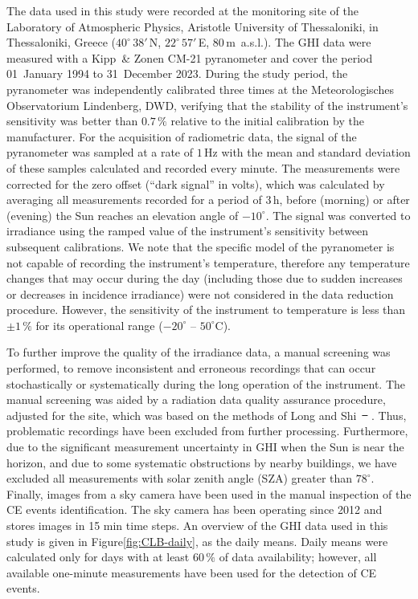 \documentclass[preprint, 5p,
authoryear]{elsarticle} %
\providecommand{\DIFaddtex}[1]{{\protect\color{blue}\uwave{#1}}} %
\providecommand{\DIFdeltex}[1]{{\protect\color{red}\sout{#1}}}                      %
\providecommand{\DIFaddbegin}{} %
\providecommand{\DIFaddend}{} %
\providecommand{\DIFdelbegin}{} %
\providecommand{\DIFdelend}{} %
\providecommand{\DIFadd}[1]{\texorpdfstring{\DIFaddtex{#1}}{#1}} %
\providecommand{\DIFdel}[1]{\texorpdfstring{\DIFdeltex{#1}}{}} %
\newcommand{\DIFscaledelfig}{0.5}
\newlength{\DIFdelgraphicswidth} %
\newlength{\DIFdelgraphicsheight} %
\newcommand{\DIFaddincludegraphics}[2][]{{\color{blue}\fbox{\DIFOincludegraphics[#1]{#2}}}} %
\newcommand{\DIFdelincludegraphics}[2][]{%
\sbox{\DIFdelgraphicsbox}{\DIFOincludegraphics[#1]{#2}}%
\settoboxwidth{\DIFdelgraphicswidth}{\DIFdelgraphicsbox} %
\settoboxtotalheight{\DIFdelgraphicsheight}{\DIFdelgraphicsbox} %
\scalebox{\DIFscaledelfig}{%
\parbox[b]{\DIFdelgraphicswidth}{\usebox{\DIFdelgraphicsbox}\\[-\baselineskip] \rule{\DIFdelgraphicswidth}{0em}}\llap{\resizebox{\DIFdelgraphicswidth}{\DIFdelgraphicsheight}{%
\setlength{\unitlength}{\DIFdelgraphicswidth}%
\begin{picture}(1,1)%
\thicklines\linethickness{2pt} %
{\color[rgb]{1,0,0}\put(0,0){\framebox(1,1){}}}%
{\color[rgb]{1,0,0}\put(0,0){\line( 1,1){1}}}%
{\color[rgb]{1,0,0}\put(0,1){\line(1,-1){1}}}%
\end{picture}%
}\hspace*{3pt}}} %
} %
\DeclareRobustCommand{\DIFaddbegin}{\DIFOaddbegin \let\includegraphics\DIFaddincludegraphics} %
\DeclareRobustCommand{\DIFaddend}{\DIFOaddend \let\includegraphics\DIFOincludegraphics} %
\DeclareRobustCommand{\DIFdelbegin}{\DIFOdelbegin \let\includegraphics\DIFdelincludegraphics} %
\DeclareRobustCommand{\DIFdelend}{\DIFOaddend \let\includegraphics\DIFOincludegraphics} %
\begin{document}
The data used in this study were recorded at the monitoring site of the
Laboratory of Atmospheric Physics, Aristotle University of Thessaloniki,
in Thessaloniki, Greece (\(40^\circ\,38'\,\)N, \(22^\circ\,57'\,\)E,
\(80\,\)m~a.s.l.). The GHI data were measured with a Kipp~\& Zonen CM-21
pyranometer and cover the period 01~January 1994 to 31~December 2023.
During the study period, the pyranometer was independently calibrated
three times at the Meteorologisches Observatorium Lindenberg, DWD,
verifying that the stability of the instrument's sensitivity was better
than \(0.7\,\%\) relative to the initial calibration by the
manufacturer. For the acquisition of radiometric data, the signal of the
pyranometer was sampled at a rate of \(1\,\text{Hz}\) with the mean and
standard deviation of these samples calculated and recorded every
minute. The measurements were corrected for the zero offset (``dark
signal'' in volts), which was calculated by averaging all measurements
recorded for a period of \(3\,\text{h}\), before (morning) or after
(evening) the Sun reaches an elevation angle of \(-10^\circ\). The
signal was converted to irradiance using the ramped value of the
instrument's sensitivity between subsequent calibrations. We note that
the specific model of the pyranometer is not capable of recording the
instrument's temperature, therefore any temperature changes that may
occur during the day (including those due to sudden increases or
decreases in incidence irradiance) were not considered in the data
reduction procedure. However, the sensitivity of the instrument to
temperature is less than \(\pm1\,\%\) for its operational range
(\(-20^\circ\) -- \(50^\circ\)C).

To further improve the quality of the irradiance data, a manual
screening was performed, to remove inconsistent and erroneous recordings
that can occur stochastically or systematically during the long
operation of the instrument. The manual screening was aided by a
radiation data quality assurance procedure, adjusted for the site, which
was based on the methods of Long and
Shi~\DIFdelbegin \DIFdel{\mbox{%
\citep{Long2006, Long2008a}}\hskip0pt%
}\DIFdelend \DIFaddbegin \DIFadd{\mbox{%
\citetext{\citeyear{Long2006}; \citeyear{Long2008a}}}\hskip0pt%
}\DIFaddend . Thus,
problematic recordings have been excluded from further processing.
Furthermore, due to the significant measurement uncertainty in GHI when
the Sun is near the horizon, and due to some systematic obstructions by
nearby buildings, we have excluded all measurements with solar zenith
angle (SZA) greater than \(78^\circ\). Finally, images from a sky camera
have been used in the manual inspection of the CE events identification.
The sky camera has been operating since 2012 and stores images in 15 min
time steps. An overview of the GHI data used in this study is given in
Figure\nobreakspace{}\ref{fig:CLB-daily}, as the daily means. Daily
means were calculated only for days with at least \(60\,\%\) of data
availability; however, all available one-minute measurements have been
used for the detection of CE events.
\end{document}
